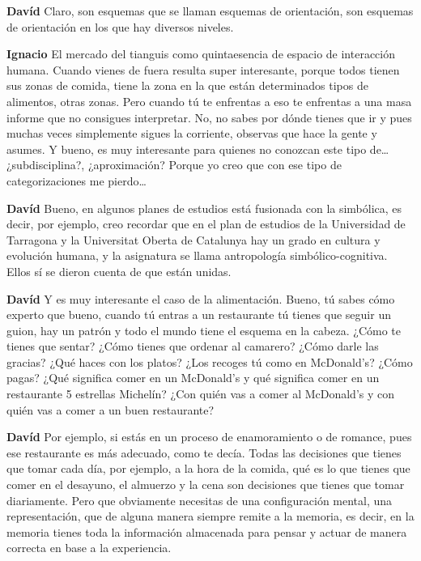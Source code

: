 \documentclass[
  spanish,
  11pt,
  a4paper,
]{scrbook}
\newenvironment{transcripcion}{
    \begin{list}{}{
        \setlength{\leftmargin}{1.5em}  %
        \setlength{\rightmargin}{0em}
        \setlength{\itemsep}{0.2em}     %
        \setlength{\parsep}{0.0em}
        \setlength{\listparindent}{0pt}
    }
}{
    \end{list}
}
\newcommand{\personaje}[1]{\textbf{#1}\quad}
\begin{document}
\begin{transcripcion}
\item \personaje{Davíd} Claro, son esquemas que se llaman esquemas de orientación, son esquemas de orientación en los que hay diversos niveles.

\item \personaje{Ignacio} El mercado del tianguis como quintaesencia de espacio de interacción humana. Cuando vienes de fuera resulta super interesante, porque todos tienen sus zonas de comida, tiene la zona en la que están determinados tipos de alimentos, otras zonas. Pero cuando tú te enfrentas a eso te enfrentas a una masa informe que no consigues interpretar. No, no sabes por dónde tienes que ir y pues muchas veces simplemente sigues la corriente, observas que hace la gente y asumes. Y bueno, es muy interesante para quienes no conozcan este tipo de… ¿subdisciplina?, ¿aproximación? Porque yo creo que con ese tipo de categorizaciones me pierdo…

\item \personaje{Davíd} Bueno, en algunos planes de estudios está fusionada con la simbólica, es decir, por ejemplo, creo recordar que en el plan de estudios de la Universidad de Tarragona y la Universitat Oberta de Catalunya hay un grado en cultura y evolución humana, y la asignatura se llama antropología simbólico-cognitiva. Ellos sí se dieron cuenta de que están unidas.

\item \personaje{Davíd} Y es muy interesante el caso de la alimentación. Bueno, tú sabes cómo experto que bueno, cuando tú entras a un restaurante tú tienes que seguir un guion, hay un patrón y todo el mundo tiene el esquema en la cabeza. ¿Cómo te tienes que sentar? ¿Cómo tienes que ordenar al camarero? ¿Cómo darle las gracias? ¿Qué haces con los platos? ¿Los recoges tú como en McDonald's? ¿Cómo pagas? ¿Qué significa comer en un McDonald's y qué significa comer en un restaurante 5 estrellas Michelín? ¿Con quién vas a comer al McDonald's y con quién vas a comer a un buen restaurante?

\item \personaje{Davíd} Por ejemplo, si estás en un proceso de enamoramiento o de romance, pues ese restaurante es más adecuado, como te decía. Todas las decisiones que tienes que tomar cada día, por ejemplo, a la hora de la comida, qué es lo que tienes que comer en el desayuno, el almuerzo y la cena son decisiones que tienes que tomar diariamente. Pero que obviamente necesitas de una configuración mental, una representación, que de alguna manera siempre remite a la memoria, es decir, en la memoria tienes toda la información almacenada para pensar y actuar de manera correcta en base a la experiencia.


\end{transcripcion}
\end{document}
